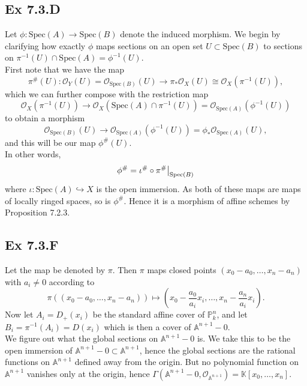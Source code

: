 \documentclass{article}
\newcommand\restr[2]{{%
  \left.\kern-\nulldelimiterspace %
  #1 %
  \vphantom{\big|} %
  \right|_{#2} %
  }}
\theoremstyle{definition}
\newcommand{\K}{\mathbb{K}}
\renewcommand{\P}{\mathbb{P}}
\newcommand{\A}{\mathbb{A}}
\newcommand{\Pn}{\P^n}
\newcommand{\Spec}{\text{Spec}}
\begin{document}
\subsection*{Ex 7.3.D}

Let $\phi : \Spec(A) \to \Spec(B)$ denote the induced morphism. We begin by
clarifying how exactly $\phi$ maps sections on an open set $U \subset \Spec(B)$
to sections on $\pi^{-1}(U) \cap \Spec(A) = \phi^{-1}(U)$. \\

First note that we have the map
\[
	\pi^{\#}(U) :
	\mathcal{O}_{Y}(U) = \mathcal{O}_{\Spec(B)}(U)
	\to
	\pi_{*}\mathcal{O}_X(U)
	\cong
	\mathcal{O}_X(\pi^{-1}(U)),
\]
which we can further compose with the restriction map
\[
	\mathcal{O}_X(\pi^{-1}(U))
	\to
	\mathcal{O}_X(\Spec(A) \cap \pi^{-1}(U))
	=
	\mathcal{O}_{\Spec(A)}(\phi^{-1}(U))
\]
to obtain a morphism
\[
	\mathcal{O}_{\Spec(B)}(U)
	\to
	\mathcal{O}_{\Spec(A)}(\phi^{-1}(U))
	=
	\phi_{*}\mathcal{O}_{\Spec(A)}(U),
\]
and this will be our map $\phi^{\#}(U)$. \\

In other words,
\[
	\phi^{\#}
	=
	\iota^{\#} \circ \restr{\pi^{\#}}{\Spec(B)}
\]
where $\iota : \Spec(A) \hookrightarrow X$ is the open immersion. As both of
these maps are maps of locally ringed spaces, so is $\phi^{\#}$. Hence it is a
morphism of affine schemes by Proposition 7.2.3.

\subsection*{Ex 7.3.F}

Let the map be denoted by $\pi$. Then $\pi$ maps closed points $(x_{0} - a_{0},
	\ldots, x_n - a_n)$ with $a_i \not = 0$ according to
\[
	\pi((x_{0} - a_{0}, \ldots, x_n - a_n))
	\mapsto
	\left(x_{0} - \frac{a_{0}}{a_i} x_i, \ldots, x_n - \frac{a_n}{a_i} x_i\right).
\]
Now let $A_i = D_{+}(x_i)$ be the standard affine cover of $\Pn_{k}$, and
let $B_i = \pi^{-1}(A_i) = D(x_i)$ which is then a cover of $\A^{n + 1} - 0$. \\

We figure out what the global sections on $\A^{n + 1} - 0$ is. We take this to
be the open immersion of $\A^{n + 1} - 0 \subset \A^{n + 1}$, hence the global
sections are the rational functions on $\A^{n + 1}$ defined away from the
origin. But no polynomial function on $\A^{n + 1}$ vanishes only at the origin,
hence $\Gamma(\A^{n + 1} - 0, \mathcal{O}_{\A^{n + 1}}) = \K[x_{0}, \ldots,
		x_n]$. \\
\end{document}
